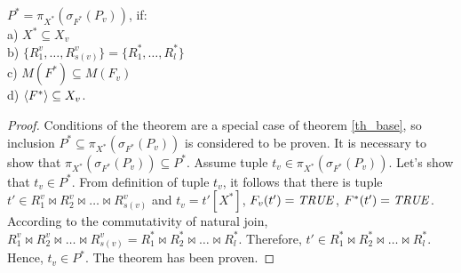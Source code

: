 \begin{theorem}
$P^{\ast} = \pi_{X^{\ast}} (\sigma_{F^{\ast}} (P_{v}))$, if:
\\a) $X^{\ast} \subseteq X_{v}$
\\b) $\{R^{v}_{1}, \ldots, R^{v}_{s(v)}\} = \{R^{\ast}_{1}, \ldots,
R^{\ast}_{l}\}$
\\c) $M (F^{\ast}) \subseteq M (F_{v}) $
\\d) $ \<F^{\ast}> \subseteq X_{v} $.
\label{th_base_eq}
\end{theorem}
\begin{proof}
Conditions of the theorem are a special case of theorem \ref{th_base}, so
inclusion $P^{\ast} \subseteq \pi_{X^{\ast}} (\sigma_{F^{\ast}} (P_{v}))$ is
considered  to be proven. It is necessary to show that $\pi_{X^{\ast}}
(\sigma_{F^{\ast}} (P_{v})) \subseteq P^{\ast}$. Assume tuple $t_v \in
\pi_{X^{\ast}} (\sigma_{F^{\ast}} (P_{v}))$. Let's show that $t_v
\in P^{\ast}$. From definition of tuple $t_v$, it follows that there is tuple
$t' \in R^v_1 \Join R^v_2\Join\ldots \Join R^v_{s(v)}$ and $t_v = t'[X^{\ast}]$,
$F_v(t')=\mathit{TRUE}$, $F^{\ast}(t')=\mathit{TRUE}$. According to the commutativity of
natural join, $R^v_1 \Join R^v_2\Join\ldots \Join R^v_{s(v)} = R^{\ast}_1 \Join
R^{\ast}_2\Join\ldots \Join R^{\ast}_l$. Therefore, $t' \in R^{\ast}_1 \Join
R^{\ast}_2\Join\ldots \Join R^{\ast}_l$. Hence, $t_v \in P^{\ast}$. The theorem
has been proven.
\end{proof}
